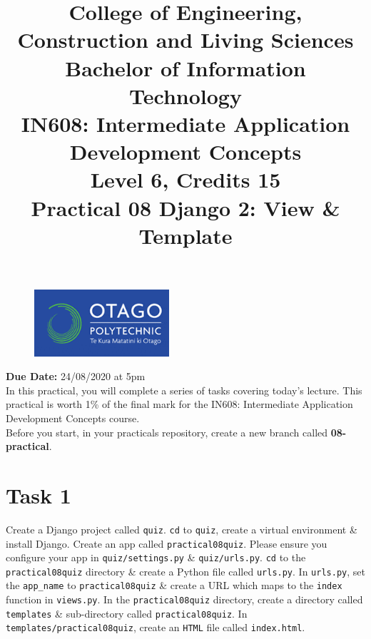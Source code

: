 \documentclass{article}
\author{}
\begin{document}
\begin{figure}
	\centering
	\includegraphics[width=50mm]{./img/logo.png}
\end{figure}

\title{College of Engineering, Construction and Living Sciences\\Bachelor of Information Technology\\IN608: Intermediate Application Development Concepts\\Level 6, Credits 15\\\textbf{Practical 08 Django 2: View \& Template}} 
\date{}
\maketitle

\textbf{Due Date:} 24/08/2020 at 5pm \\

In this practical, you will complete a series of tasks covering today's lecture. This practical is worth 1\% of the final mark for the IN608: Intermediate Application Development Concepts course. \\

Before you start, in your practicals repository, create a new branch called \textbf{08-practical}.

\section*{Task 1} 
Create a Django project called \texttt{quiz}. \texttt{cd} to \texttt{quiz}, create a virtual environment \& install Django. Create an app called \texttt{practical08quiz}. Please ensure you configure your app in \texttt{quiz/settings.py} \& \texttt{quiz/urls.py}. \texttt{cd} to the \texttt{practical08quiz} directory \& create a Python file called \texttt{urls.py}. In \texttt{urls.py}, set the \texttt{app\_name} to \texttt{practical08quiz} \& create a URL which maps to the \texttt{index} function in \texttt{views.py}. In the \texttt{practical08quiz} directory, create a directory called \texttt{templates} \& sub-directory called \texttt{practical08quiz}. In \texttt{templates/practical08quiz}, create an \texttt{HTML} file called \texttt{index.html}. \\
\end{document}

